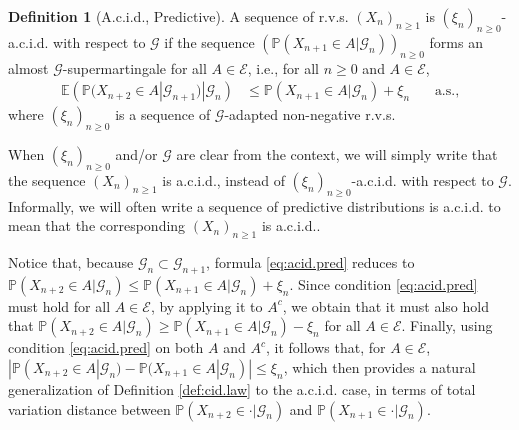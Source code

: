 \documentclass{article}
\theoremstyle{definition}
\newtheorem{definition}{Definition}
\newcommand{\red}[1]{\textcolor{red}{#1}}
\renewcommand{\&}{and}
\begin{document}

\begin{definition}[A.c.i.d., Predictive] \label{def:acid.pred}
    A sequence of r.v.s. $(X_{n})_{n\geq 1}$ is  $(\xi_{n})_{n\geq 0}$-a.c.i.d. with respect to $\mathcal{G}$  if the sequence
  $  \left( \mathbb{P}\left(X_{n+1} \in A |\mathcal{G}_{n} \right) \right)_{n\geq 0}$
    forms an almost $\mathcal{G}$-supermartingale  for all $A\in \mathcal{E}$, i.e., for all $n \geq 0$ and $A\in \mathcal{E}$, 
\begin{align} \label{eq:acid.pred}
    \mathbb{E}\left( \mathbb{P}(X_{n+2} \in A |\mathcal{G}_{n+1}) | \mathcal{G}_{n} \right) & \leq \mathbb{P}(X_{n+1} \in A |\mathcal{G}_{n}) +\xi_{n}  \ \ \ \ \ \ \ \  \text{a.s.,}
\end{align}
 where $(\xi_{n})_{n\geq 0}$ is a sequence of $\mathcal{G}$-adapted non-negative r.v.s.
\end{definition}

When $(\xi_{n})_{n\geq 0}$ and/or $\mathcal{G}$ are clear from the context, we will simply write that the sequence $(X_{n})_{n\geq 1}$ is a.c.i.d., instead of $(\xi_{n})_{n\geq 0}$-a.c.i.d. with respect to $\mathcal{G}$. Informally, we will often write a sequence of predictive distributions is a.c.i.d. to mean that the corresponding $(X_{n})_{n\geq 1}$ is a.c.i.d..

Notice that, because $\mathcal{G}_{n}\subset \mathcal{G}_{n+1}$, formula \eqref{eq:acid.pred} reduces to $\mathbb{P}(X_{n+2} \in A |\mathcal{G}_{n})  \leq \mathbb{P}(X_{n+1} \in A |\mathcal{G}_{n}) +\xi_{n}$. Since condition \eqref{eq:acid.pred} must hold for all $A\in \mathcal{E}$, by applying it to $A^{c}$, we obtain that it must also hold that $\mathbb{P}(X_{n+2} \in A |\mathcal{G}_{n})  \geq \mathbb{P}(X_{n+1} \in A |\mathcal{G}_{n}) - \xi_{n}$ for all $A\in \mathcal{E}$. %
Finally, using condition \eqref{eq:acid.pred} on both $A$ and $A^{c}$, it follows that, for $A\in \mathcal{E}$,  $| \mathbb{P}(X_{n+2} \in A |\mathcal{G}_{n})  - \mathbb{P}(X_{n+1} \in A |\mathcal{G}_{n}) | \leq \xi_{n}$, which then provides a natural generalization of Definition \ref{def:cid.law} to the a.c.i.d. case, in terms of total variation distance between $\mathbb{P}(X_{n+2} \in \cdot |\mathcal{G}_{n})$ and $\mathbb{P}(X_{n+1} \in \cdot |\mathcal{G}_{n})$.
\end{document}

